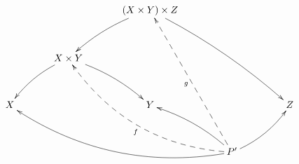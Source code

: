 \documentclass[a4paper,ngerman]{scrartcl}
\theoremstyle{definition}
\theoremstyle{plain}
\theoremstyle{remark}
\begin{document}
\[ \xymatrix@=8ex{
  && (X \times Y) \times Z \ar@/_/[dl] \ar@/^/[ddrr] \\
 & X \times Y \ar@/_/[ld] \ar@/^/[rd] && \text{$\phantom{X \times Y}$} \\
 X && Y && Z \\
 &&& P'
  \ar@/^2pc/@{-->}[lluu]^f
  \ar@/^2pc/[lllu] \ar@/_/[lu] \ar@/_/[ru]
  \ar@{-->}[luuu]^g
} \]
\end{document}
